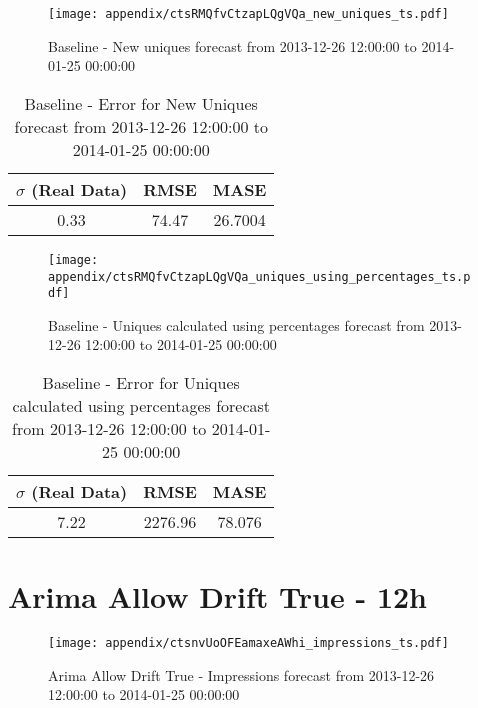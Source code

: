\begin{figure}[H] \begin{center} \leavevmode
\texttt{[image: appendix/ctsRMQfvCtzapLQgVQa\_new\_uniques\_ts.pdf]} \caption{
Baseline - New uniques forecast from 2013-12-26 12:00:00 to 2014-01-25 00:00:00} \label{fig:appendix/ctsRMQfvCtzapLQgVQa_new_uniques_ts.pdf} \end{center}
\end{figure}

\begin{table}[H]
\centering
\footnotesize
\begin{tabular}{ccc}
$\sigma$ (Real Data) & RMSE & MASE   \\ \hline
0.33 & 74.47 & 26.7004 \\
\end{tabular}

\vspace{0.5cm}

\caption{
Baseline - Error for New Uniques forecast from 2013-12-26 12:00:00 to 2014-01-25 00:00:00}
\end{table}

\begin{figure}[H] \begin{center} \leavevmode
\texttt{[image: appendix/ctsRMQfvCtzapLQgVQa\_uniques\_using\_percentages\_ts.pdf]} \caption{
Baseline - Uniques calculated using percentages forecast from 2013-12-26 12:00:00 to 2014-01-25 00:00:00} \label{fig:appendix/ctsRMQfvCtzapLQgVQa_uniques_using_percentages_ts.pdf} \end{center}
\end{figure}

\begin{table}[H]
\centering
\footnotesize
\begin{tabular}{ccc}
$\sigma$ (Real Data) & RMSE & MASE   \\ \hline
7.22 & 2276.96 & 78.076 \\
\end{tabular}

\vspace{0.5cm}

\caption{
Baseline - Error for Uniques calculated using percentages forecast from 2013-12-26 12:00:00 to 2014-01-25 00:00:00}
\end{table}

\section{Arima Allow Drift True - 12h}
\begin{figure}[H] \begin{center} \leavevmode
\texttt{[image: appendix/ctsnvUoOFEamaxeAWhi\_impressions\_ts.pdf]} \caption{
Arima Allow Drift True - Impressions forecast from 2013-12-26 12:00:00 to 2014-01-25 00:00:00} \label{fig:appendix/ctsnvUoOFEamaxeAWhi_impressions_ts.pdf} \end{center}
\end{figure}

